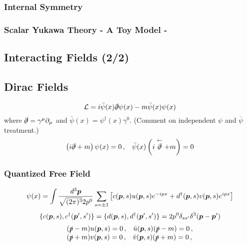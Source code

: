 \documentclass{jarticle}
\newcommand{\bld}[1]{\mbox{\boldmath $#1$}}
\newcommand{\myqftsrcdirectory}[0]{./}
\newcommand{\mainqftsrcdirectory}[0]{../src_qft}
\begin{document}
\subsubsection{Internal Symmetry}

\subsubsection{Scalar Yukawa Theory - A Toy Model -}


\subsection{Interacting Fields (2/2)}

\label{sec:InteractingFields2}

\newpage
\subsection{Dirac Fields}


\newpage 
\begin{equation}
{\cal L} = i \bar{\psi}(x) \slashed{\partial} \psi(x) - m \bar{\psi}(x) \psi(x)
\end{equation}
where $\slashed{\partial} = \gamma^\mu \partial_\mu$ and
$\bar{\psi}(x) = \psi^\dagger (x) \gamma^0$.
(Comment on independent $\psi$ and $\overline{\psi}$ treatment.)
\begin{equation}
\left(i \slashed{\partial} + m \right) \psi(x) = 0\,,
\hspace{3mm}
\bar{\psi}(x) \left(i \stackrel{\leftarrow}{\slashed{\partial}} + m \right)  = 0
\end{equation}
\subsubsection{Quantized Free Field}
\begin{equation}
\psi(x) 
=
\int \frac{d^3 \bld{p}}{\sqrt{(2\pi)^3} 2 p^0}
\sum_{s = \pm 1}
\left[
c(\bld{p}, s) u(\bld{p}, s) e^{-ipx}
+
d^\dagger(\bld{p}, s) v(\bld{p}, s) e^{ipx}
\right]
\end{equation}
\begin{equation}
\{ c(\bld{p}, s), c^\dagger(\bld{p}', s') \}
=
\{ d(\bld{p}, s), d^\dagger(\bld{p}', s') \}
=
2p^0 \delta_{ss'}
\delta^3(\bld{p} - \bld{p}')
\end{equation}
\begin{equation}
\begin{array}{l}
(\slashed{p} - m) u(\bld{p}, s) = 0\,,
\hspace{3mm}
\bar{u}(\bld{p}, s)(\slashed{p} - m)  = 0\,,
\\
(\slashed{p} + m) v(\bld{p}, s) = 0\,,
\hspace{3mm}
\bar{v}(\bld{p}, s)(\slashed{p} + m)  = 0\,,
\end{array}
\end{equation}
\end{document}
